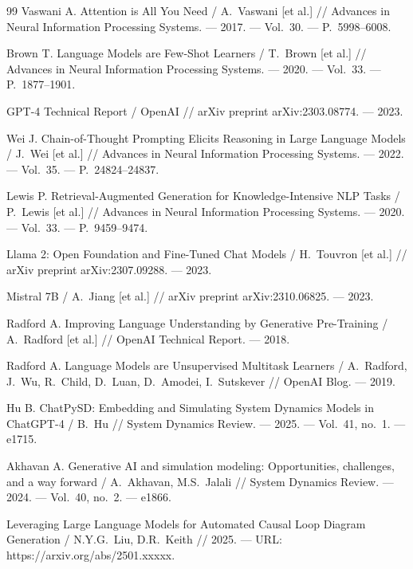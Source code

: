 \begin{thebibliography}{99}
    Vaswani A. Attention is All You Need / A.~Vaswani [et al.] // Advances in Neural Information Processing Systems. --- 2017. --- Vol.~30. --- P.~5998--6008.

    Brown T. Language Models are Few-Shot Learners / T.~Brown [et al.] // Advances in Neural Information Processing Systems. --- 2020. --- Vol.~33. --- P.~1877--1901.

    GPT-4 Technical Report / OpenAI // arXiv preprint arXiv:2303.08774. --- 2023.

    Wei J. Chain-of-Thought Prompting Elicits Reasoning in Large Language Models / J.~Wei [et al.] // Advances in Neural Information Processing Systems. --- 2022. --- Vol.~35. --- P.~24824--24837.

    Lewis P. Retrieval-Augmented Generation for Knowledge-Intensive NLP Tasks / P.~Lewis [et al.] // Advances in Neural Information Processing Systems. --- 2020. --- Vol.~33. --- P.~9459--9474.

    Llama 2: Open Foundation and Fine-Tuned Chat Models / H.~Touvron [et al.] // arXiv preprint arXiv:2307.09288. --- 2023.

    Mistral 7B / A.~Jiang [et al.] // arXiv preprint arXiv:2310.06825. --- 2023.

    Radford A. Improving Language Understanding by Generative Pre-Training / A.~Radford [et al.] // OpenAI Technical Report. --- 2018.

    Radford A. Language Models are Unsupervised Multitask Learners / A.~Radford, J.~Wu, R.~Child, D.~Luan, D.~Amodei, I.~Sutskever // OpenAI Blog. --- 2019.

    Hu B. ChatPySD: Embedding and Simulating System Dynamics Models in ChatGPT-4 / B.~Hu // System Dynamics Review. --- 2025. --- Vol.~41, no.~1. --- e1715.

    Akhavan A. Generative AI and simulation modeling: Opportunities, challenges, and a way forward / A.~Akhavan, M.S.~Jalali // System Dynamics Review. --- 2024. --- Vol.~40, no.~2. --- e1866.

    Leveraging Large Language Models for Automated Causal Loop Diagram Generation / N.Y.G.~Liu, D.R.~Keith // 2025. --- URL: https://arxiv.org/abs/2501.xxxxx.


\end{thebibliography}
